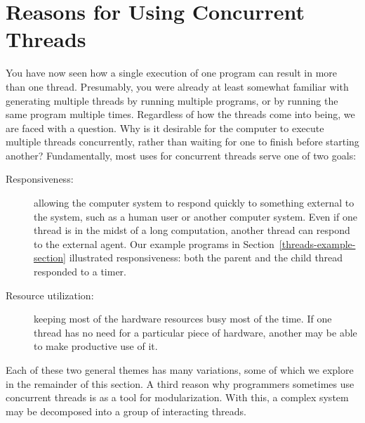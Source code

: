 \section{Reasons for Using Concurrent Threads}\label{threads-uses-section}
You have now seen how a single execution of one program can result in
more than one thread.  Presumably, you were already at least somewhat
familiar with generating multiple threads by running multiple
programs, or by running the same program multiple times.  Regardless
of how the threads come into being, we are faced with a question.  Why
is it desirable for the computer to execute multiple threads
concurrently, rather than waiting for one to finish before starting
another?
Fundamentally, most uses for concurrent threads serve one of two goals:
\begin{description}
\item[Responsiveness:] allowing the computer system to respond quickly
  to something external to the system, such as a human user or another
  computer system.  Even if one thread is in the midst of a long
  computation, another thread can respond to the external agent.  Our
  example programs in Section~\ref{threads-example-section}
  illustrated responsiveness: both the parent and the child thread
  responded to a timer.
\item[Resource utilization:] keeping most of the hardware resources
  busy most of the time.  If one thread has no need for a
  particular piece of hardware, another may be able to make productive
  use of it.
\end{description}
Each of these two general themes has many variations, some of which we
explore in the remainder of this section.  A third reason why
programmers sometimes use concurrent threads is as a tool for
modularization.  With this, a complex system may be decomposed into a group of
interacting threads.

